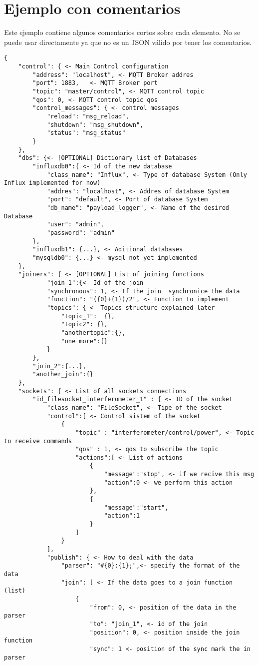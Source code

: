 \documentclass[12pt, a4paper, oneside, titlepage]{article}
\begin{document}
\section*{Ejemplo con comentarios}

Este ejemplo contiene algunos comentarios cortos sobre cada elemento.
No se puede usar directamente ya que no es un JSON válido por tener los comentarios.
\begin{lstlisting}
{
	"control": { <- Main Control configuration
		"address": "localhost", <- MQTT Broker addres
		"port": 1883,	<- MQTT Broker port
		"topic": "master/control", <- MQTT control topic
		"qos": 0, <- MQTT control topic qos
		"control_messages": { <- control messages
			"reload": "msg_reload",
			"shutdown": "msg_shutdown",
			"status": "msg_status"
		}
	},
	"dbs": {<- [OPTIONAL] Dictionary list of Databases
		"influxdb0":{ <- Id of the new database
			"class_name": "Influx", <- Type of database System (Only Influx implemented for now)
			"addres": "localhost", <- Addres of database System
			"port": "default", <- Port of database System
			"db_name": "payload_logger", <- Name of the desired Database
			"user": "admin", 
			"password": "admin"
		},
		"influxdb1": {...}, <- Aditional databases
		"mysqldb0": {...} <- mysql not yet implemented
    },
	"joiners": { <- [OPTIONAL] List of joining functions
			"join_1":{<- Id of the join
			"synchronous": 1, <- If the join  synchronice the data
			"function": "({0}+{1})/2", <- Function to implement
			"topics": { <- Topics structure explained later
				"topic_1":  {},
				"topic2": {},
				"anothertopic":{},
				"one more":{}
			}
		},
		"join_2":{...},
		"another_join":{}
	},
	"sockets": { <- List of all sockets connections
		"id_filesocket_interferometer_1" : { <- ID of the socket
			"class_name": "FileSocket", <- Tipe of the socket
			"control":[ <- Control sistem of the socket
				{
					"topic" : "interferometer/control/power", <- Topic to receive commands
					"qos" : 1, <- qos to subscribe the topic
					"actions":[ <- List of actions
						{
							"message":"stop", <- if we recive this msg
							"action":0 <- we perform this action
						},
						{
							"message":"start",
							"action":1
						}
					]
				}
			],
			"publish": { <- How to deal with the data
				"parser": "#{0}:{1};",<- specify the format of the data
				"join": [ <- If the data goes to a join function (list)
					{
						"from": 0, <- position of the data in the parser
						"to": "join_1", <- id of the join
						"position": 0, <- position inside the join function
						"sync": 1 <- position of the sync mark the in parser

\end{lstlisting}
\end{document}
